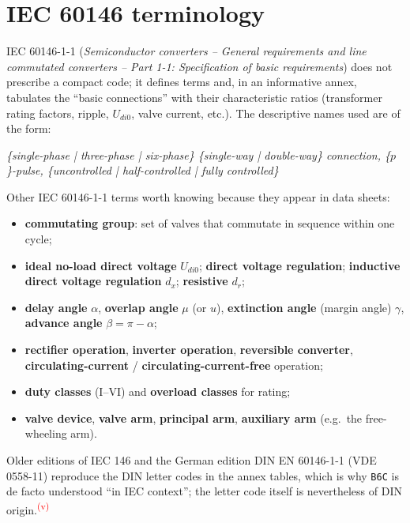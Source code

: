 \documentclass[11pt,a4paper]{article}
\newcommand{\code}[1]{\texttt{#1}}
\newcommand{\verify}{\textsuperscript{\textcolor{red}{(v)}}}
\begin{document}
\section{IEC 60146 terminology}

IEC 60146-1-1 (\emph{Semiconductor converters -- General requirements and line commutated converters -- Part 1-1: Specification of basic requirements}) does not prescribe a compact code; it defines terms and, in an informative annex, tabulates the ``basic connections'' with their characteristic ratios (transformer rating factors, ripple, $U_{di0}$, valve current, etc.). The descriptive names used are of the form:

\begin{center}
\emph{\{single-phase | three-phase | six-phase\} \{single-way | double-way\} connection, \{$p$\}-pulse, \{uncontrolled | half-controlled | fully controlled\}}
\end{center}

Other IEC 60146-1-1 terms worth knowing because they appear in data sheets:
\begin{itemize}
\item \textbf{commutating group}: set of valves that commutate in sequence within one cycle;
\item \textbf{ideal no-load direct voltage} $U_{di0}$; \textbf{direct voltage regulation}; \textbf{inductive direct voltage regulation} $d_x$; \textbf{resistive} $d_r$;
\item \textbf{delay angle} $\alpha$, \textbf{overlap angle} $\mu$ (or $u$), \textbf{extinction angle} (margin angle) $\gamma$, \textbf{advance angle} $\beta = \pi-\alpha$;
\item \textbf{rectifier operation}, \textbf{inverter operation}, \textbf{reversible converter}, \textbf{circulating-current} / \textbf{circulating-current-free} operation;
\item \textbf{duty classes} (I--VI) and \textbf{overload classes} for rating;
\item \textbf{valve device}, \textbf{valve arm}, \textbf{principal arm}, \textbf{auxiliary arm} (e.g.\ the free-wheeling arm).
\end{itemize}

Older editions of IEC 146 and the German edition DIN EN 60146-1-1 (VDE 0558-11) reproduce the DIN letter codes in the annex tables, which is why \code{B6C} is de facto understood ``in IEC context''; the letter code itself is nevertheless of DIN origin.\verify
\end{document}
